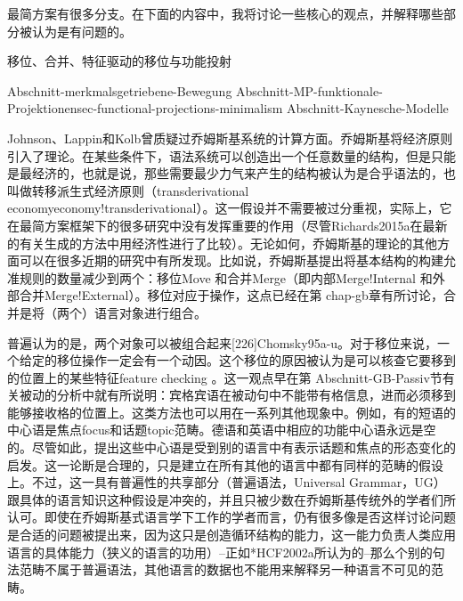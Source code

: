 最简方案有很多分支。在下面的内容中，我将讨论一些核心的观点，并解释哪些部分被认为是有问题的。



移位、合并、特征驱动的移位与功能投射

Abschnitt-merkmalsgetriebene-Bewegung
Abschnitt-MP-funktionale-Projektionensec-functional-projections-minimalism
Abschnitt-Kaynesche-Modelle

Johnson、Lappin和Kolb曾质疑过乔姆斯基系统的计算方面。乔姆斯基将经济原则引入了理论。在某些条件下，语法系统可以创造出一个任意数量的结构，但是只能是最经济的，也就是说，那些需要最少力气来产生的结构被认为是合乎语法的，也叫做转移派生式经济原则（transderivational economyeconomy!transderivational）。这一假设并不需要被过分重视，实际上，它在最简方案框架下的很多研究中没有发挥重要的作用（尽管Richards2015a在最新的有关生成的方法中用经济性进行了比较）。无论如何，乔姆斯基的理论的其他方面可以在很多近期的研究中有所发现。比如说，乔姆斯基提出将基本结构的构建允准规则的数量减少到两个：移位Move 和合并Merge（即内部Merge!Internal 和外部合并Merge!External）。移位对应于操作，这点已经在第 chap-gb章有所讨论，合并是将（两个）语言对象进行组合。











普遍认为的是，两个对象可以被组合起来[226]Chomsky95a-u。对于移位来说，一个给定的移位操作一定会有一个动因。这个移位的原因被认为是可以核查它要移到的位置上的某些特征feature checking 。这一观点早在第 Abschnitt-GB-Passiv节有关被动的分析中就有所说明：宾格宾语在被动句中不能带有格信息，进而必须移到能够接收格的位置上。这类方法也可以用在一系列其他现象中。例如，有的短语的中心语是焦点focus和话题topic范畴。德语和英语中相应的功能中心语永远是空的。尽管如此，提出这些中心语是受到别的语言中有表示话题和焦点的形态变化的启发。这一论断是合理的，只是建立在所有其他的语言中都有同样的范畴的假设上。不过，这一具有普遍性的共享部分（普遍语法，Universal Grammar，UG）跟具体的语言知识这种假设是冲突的，并且只被少数在乔姆斯基传统外的学者们所认可。即使在乔姆斯基式语言学下工作的学者而言，仍有很多像是否这样讨论问题是合适的问题被提出来，因为这只是创造循环结构的能力，这一能力负责人类应用语言的具体能力（狭义的语言的功用）--正如*HCF2002a所认为的--那么个别的句法范畴不属于普遍语法，其他语言的数据也不能用来解释另一种语言不可见的范畴。



















